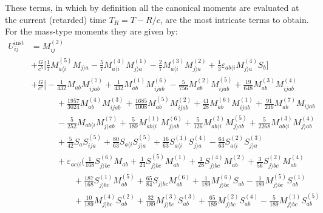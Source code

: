 \documentclass[prd,preprint,superscriptaddress,tightenlines,nofootinbib,
  eqsecnum,showpacs]{revtex4}
\begin{document}
These terms, in which by definition all the canonical moments are
evaluated at the current (retarded) time $T_R=T-R/c$, are the most
intricate terms to obtain. For the mass-type moments they are given
by:
%
\begin{subequations}
\begin{align}
U_{ij}^\text{inst} &= M^{(2)}_{ij} \nonumber \\ &+\frac{G}{
  c^5}\biggl[ \frac{1}{ 7}M^{(5)}_{a\langle i}M_{j\rangle a} -
  \frac{5}{7} M^{(4)}_{a\langle i}M^{(1)}_{j\rangle a} -\frac{2}{7}
  M^{(3)}_{a\langle i}M^{(2)}_{j\rangle a}
  +\frac{1}{3}\varepsilon_{ab\langle i}M^{(4)}_{j\rangle
    a}S_{b}\biggr]\nonumber \\ & + \frac{G}{c^7} \bigg[- \frac{1}{432}
  M_{ab} M_{ijab}^{(7)} + \frac{1}{432} M_{ab}^{(1)} M_{ijab}^{(6)} -
  \frac{5}{756} M_{ab}^{(2)} M_{ijab}^{(5)} + \frac{19}{648}
  M_{ab}^{(3)} M_{ijab}^{(4)} \nonumber \\ & \quad\qquad +
  \frac{1957}{3024} M_{ab}^{(4)} M_{ijab}^{(3)} + \frac{1685}{1008}
  M_{ab}^{(5)} M_{ijab}^{(2)} + \frac{41}{28} M_{ab}^{(6)}
  M_{ijab}^{(1)} + \frac{91}{216} M_{ab}^{(7)} M_{ijab} \nonumber \\ &
  \quad\qquad - \frac{5}{252} M_{ab \langle i} M_{j \rangle ab}^{(7)}
  + \frac{5}{189} M_{ab \langle i}^{(1)} M_{j \rangle ab}^{(6)} +
  \frac{5}{126} M_{ab \langle i}^{(2)} M_{j \rangle ab}^{(5)} +
  \frac{5}{2268} M_{ab \langle i}^{(3)} M_{j \rangle ab}^{(4)}
  \nonumber \\ & \quad\qquad + \frac{5}{42} S_a S_{ija}^{(5)} +
  \frac{80}{63} S_{a \langle i} S_{j \rangle a}^{(5)} + \frac{16}{63}
  S_{a \langle i}^{(1)} S_{j \rangle a}^{(4)} - \frac{64}{63} S_{a
    \langle i}^{(2)} S_{j \rangle a}^{(3)} \nonumber \\ & \quad\qquad
  + \varepsilon_{ac \langle i} \Big( \frac{1}{168} S_{j \rangle
    bc}^{(6)} M_{ab} + \frac{1}{24} S_{j\rangle bc}^{(5)} M_{ab}^{(1)}
  + \frac{1}{28} S_{j \rangle bc}^{(4)} M_{ab}^{(2)} + \frac{3}{56}
  S_{j \rangle bc}^{(2)} M_{ab}^{(4)} \nonumber \\ & \quad\qquad\qquad
  + \frac{187}{168} S_{j \rangle bc}^{(1)} M_{ab}^{(5)} +
  \frac{65}{84} S_{j \rangle bc} M_{ab}^{(6)} + \frac{1}{189} M_{j
    \rangle bc}^{(6)} S_{ab} - \frac{1}{189} M_{j \rangle bc}^{(5)}
  S_{ab}^{(1)} \nonumber \\ & \quad\qquad\qquad + \frac{10}{189} M_{j
    \rangle bc}^{(4)} S_{ab}^{(2)} + \frac{32}{189} M_{j \rangle
    bc}^{(3)} S_{ab}^{(3)} + \frac{65}{189} M_{j \rangle bc}^{(2)}
  S_{ab}^{(4)} - \frac{5}{189} M_{j \rangle bc}^{(1)} S_{ab}^{(5)}

\end{align}
\end{subequations}
\end{document}
